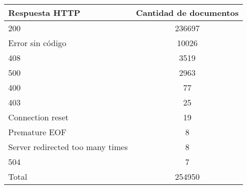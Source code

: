 \begin{tabular}{| l | c | }\hline
   Respuesta HTTP & Cantidad de documentos \\\hline
   200 & 236697 \\
   Error sin código & 10026 \\
   408 & 3519 \\
   500 & 2963 \\
   400 & 77 \\
   403 & 25 \\
   Connection reset & 19 \\
   Premature EOF & 8 \\
   Server redirected too many times & 8 \\
   504 & 7 \\\hline
   Total & 254950 \\\hline
 \end{tabular}

